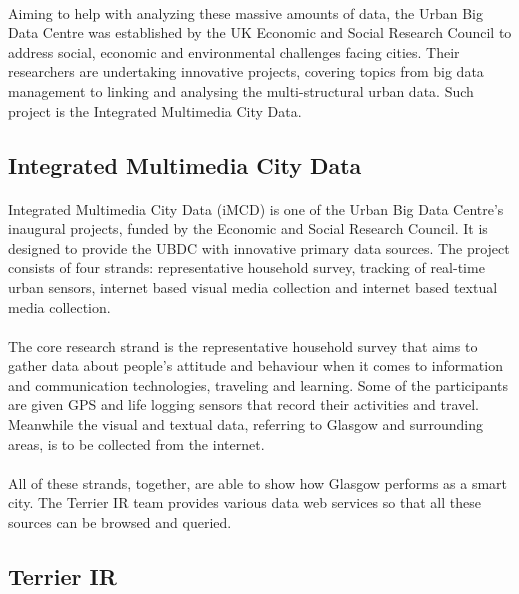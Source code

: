 \documentclass{l4proj}
\begin{document}
\paragraph{}
Aiming to help with analyzing these massive amounts of data, the Urban Big Data Centre was established by the UK Economic and Social Research Council to address social, economic and environmental challenges facing cities. Their researchers are undertaking innovative projects, covering topics from big data management to linking and analysing the multi-structural urban data.  Such project is the Integrated Multimedia City Data. 



\subsection{Integrated Multimedia City Data}

\paragraph{}
Integrated Multimedia City Data\cite{imcd} (iMCD) is one of the Urban Big Data Centre’s inaugural projects, funded by the Economic and Social Research Council. It is designed to provide the UBDC with innovative primary data sources. The project consists of four strands: representative household survey, tracking of real-time urban sensors, internet based visual media collection and internet based textual media collection.  
\paragraph{}
The core research strand is the representative household survey that aims to gather data about people’s attitude and behaviour when it comes to information and communication technologies, traveling and learning. Some of the participants are given GPS and life logging sensors that record their activities and travel. Meanwhile the visual and textual data, referring to Glasgow and surrounding areas, is to be collected from the internet. 
\paragraph{}
All of these strands, together, are able to show how Glasgow performs as a smart city.  The Terrier IR team provides various data web services so that all these sources can be browsed and queried.

\subsection{Terrier IR}
\end{document}
